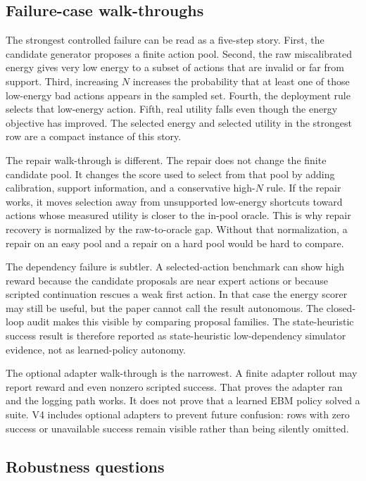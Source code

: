 \subsection{Failure-case walk-throughs}
\label{app:V4-failure-walkthroughs}

The strongest controlled failure can be read as a five-step story. First, the
candidate generator proposes a finite action pool. Second, the raw
miscalibrated energy gives very low energy to a subset of actions that are
invalid or far from support. Third, increasing \(N\) increases the probability
that at least one of those low-energy bad actions appears in the sampled set.
Fourth, the deployment rule selects that low-energy action. Fifth, real
utility falls even though the energy objective has improved. The selected
energy \VFourEBMRawHighNEnergy{} and selected utility
\VFourEBMRawHighNUtility{} in the strongest row are a compact instance of
this story.

The repair walk-through is different. The repair does not change the finite
candidate pool. It changes the score used to select from that pool by adding
calibration, support information, and a conservative high-\(N\) rule. If the
repair works, it moves selection away from unsupported low-energy shortcuts
toward actions whose measured utility is closer to the in-pool oracle. This is
why repair recovery is normalized by the raw-to-oracle gap. Without that
normalization, a repair on an easy pool and a repair on a hard pool would be
hard to compare.

The dependency failure is subtler. A selected-action benchmark can show high
reward because the candidate proposals are near expert actions or because
scripted continuation rescues a weak first action. In that case the energy
scorer may still be useful, but the paper cannot call the result autonomous.
The closed-loop audit makes this visible by comparing proposal families. The
state-heuristic success result is therefore reported as state-heuristic
low-dependency simulator evidence, not as learned-policy autonomy.

The optional adapter walk-through is the narrowest. A finite adapter rollout
may report reward and even nonzero scripted success. That proves the adapter
ran and the logging path works. It does not prove that a learned EBM policy
solved a suite. V4 includes optional adapters to prevent future confusion:
rows with zero success or unavailable success remain visible rather than being
silently omitted.

\subsection{Robustness questions}
\label{app:V4-robustness-questions}

